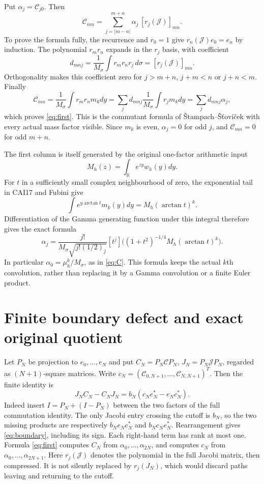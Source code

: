 \documentclass[11pt]{article}
\newcommand{\R}{\mathbb R}
\begin{document}
Put $\alpha_j=\mathcal C_{j0}$. Then
\begin{equation}\label{eq:first}
 \boxed{\mathcal C_{mn}=
 \sum_{j=|m-n|}^{m+n}\alpha_j\,[r_j(\mathcal J)]_{mn}.}
\end{equation}
To prove the formula fully, the recurrence and $r_0=1$ give
$r_n(\mathcal J)e_0=e_n$ by induction. The polynomial $r_mr_n$
expands in the $r_j$ basis, with coefficient
\[
 d_{mnj}=\frac1{M_\sigma}\int r_m r_n r_j\,d\sigma
 =[r_j(\mathcal J)]_{mn}.
\]
Orthogonality makes this coefficient zero for $j>m+n$, $j+m<n$
or $j+n<m$. Finally
\[
 \mathcal C_{mn}=\frac1{M_\sigma}\int r_mr_n m_kdy
 =\sum_j d_{mnj}\frac1{M_\sigma}\int r_jm_kdy
 =\sum_j d_{mnj}\alpha_j,
\]
which proves \eqref{eq:first}. This is the commutant formula of
\v{S}tampach--\v{S}\v{t}ov\'{i}\v{c}ek with every actual mass
factor visible. Since $m_k$ is even, $\alpha_j=0$ for odd $j$,
and $\mathcal C_{mn}=0$ for odd $m+n$.

The first column is itself generated by the original one-factor
arithmetic input
\[
 M_h(z)=\int_\R e^{zy}w_h(y)dy.
\]
For $t$ in a sufficiently small complex neighbourhood of zero,
the exponential tail in CAI17 and Fubini give
\[
 \int e^{y\arctan t}m_k(y)dy=M_h(\arctan t)^k.
\]
Differentiation of the Gamma generating function under this integral
therefore gives the exact formula
\begin{equation}\label{eq:alpha}
 \boxed{\alpha_j=
 \frac{j!}{M_\sigma\sqrt{j!(1/2)_j}}
 [t^j]\bigl((1+t^2)^{-1/4}M_h(\arctan t)^k\bigr).}
\end{equation}
In particular $\alpha_0=\mu_h^k/M_\sigma$, as in \eqref{eq:C}.
This formula keeps the actual $k$th convolution, rather than
replacing it by a Gamma convolution or a finite Euler product.

\section{Finite boundary defect and exact original quotient}
Let $P_N$ be projection to $e_0,\ldots,e_N$ and put
$C_N=P_N\mathcal C P_N$, $J_N=P_N\mathcal J P_N$, regarded as
$(N+1)$-square matrices. Write
$c_N=(\mathcal C_{0,N+1},\ldots,\mathcal C_{N,N+1})^T$.
Then the finite identity is
\begin{equation}\label{eq:boundary}
 \boxed{J_NC_N-C_NJ_N=b_N(c_Ne_N^*-e_Nc_N^*).}
\end{equation}
Indeed insert $I=P_N+(I-P_N)$ between the two factors of the full
commutation identity. The only Jacobi entry crossing the cutoff is
$b_N$, so the two missing products are respectively
$b_Ne_Nc_N^*$ and $b_Nc_Ne_N^*$. Rearrangement gives
\eqref{eq:boundary}, including its sign. Each right-hand term has
rank at most one. Formula \eqref{eq:first} computes $C_N$ from
$\alpha_0,\ldots,\alpha_{2N}$, and computes $c_N$ from
$\alpha_0,\ldots,\alpha_{2N+1}$.
Here $r_j(\mathcal J)$ denotes the polynomial in the full Jacobi
matrix, then compressed. It is not silently replaced by $r_j(J_N)$,
which would discard paths leaving and returning to the cutoff.
\end{document}
